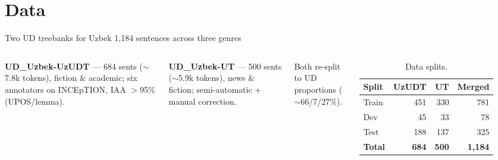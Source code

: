 \documentclass[t,10pt]{beamer}
\begin{document}
\section{Data}

\begin{frame}{Two UD treebanks for Uzbek}%
             {1{,}184 sentences across three genres}
  \begin{columns}[onlytextwidth]
      \footnotesize
      \textbf{UD\_Uzbek-UzUDT} --- 684 sents ($\sim$7.8k tokens),
      fiction \& academic; six annotators on INCEpTION,
      IAA $>$95\% (UPOS/lemma).\par\medskip
      \textbf{UD\_Uzbek-UT} --- 500 sents ($\sim$5.9k tokens),
      news \& fiction; semi-automatic + manual correction.\par\medskip
      Both re-split to UD proportions ($\sim$66/7/27\%).
      \begin{table}
        \footnotesize
        \begin{tabularx}{\textwidth}{Xrrr}
          \textbf{Split} & \textbf{UzUDT} & \textbf{UT} & \textbf{Merged}\\
          \toprule
          Train & 451 & 330 & 781 \\
          Dev   & 45  & 33  & 78  \\
          Test  & 188 & 137 & 325 \\
          \midrule
          \textbf{Total} & \textbf{684} & \textbf{500} & \textbf{1{,}184}\\
          \bottomrule
        \end{tabularx}
        \caption{Data splits.}
      \end{table}
  \end{columns}
\end{frame}
\end{document}
